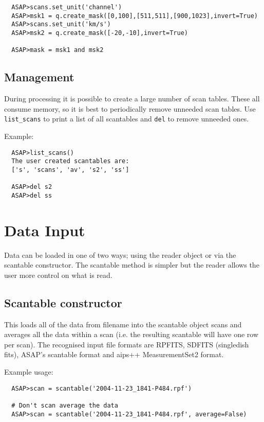 \documentclass[11pt]{article}
\newcommand{\cmd}[1]{{\tt #1}}
\begin{document}
\begin{verbatim}
  ASAP>scans.set_unit('channel')
  ASAP>msk1 = q.create_mask([0,100],[511,511],[900,1023],invert=True)
  ASAP>scans.set_unit('km/s')
  ASAP>msk2 = q.create_mask([-20,-10],invert=True)

  ASAP>mask = msk1 and msk2
\end{verbatim}


\subsection{Management}

During processing it is possible to create
a large number of scan tables. These all consume memory, so it is best
to periodically remove unneeded scan tables. Use \cmd{list\_scans} to
print a list of all scantables and \cmd{del} to remove unneeded ones.

Example:

\begin{verbatim}
  ASAP>list_scans()
  The user created scantables are:
  ['s', 'scans', 'av', 's2', 'ss']

  ASAP>del s2
  ASAP>del ss
\end{verbatim}

\section{Data Input}

Data can be loaded in one of two ways; using the
reader object or via the scantable constructor. The scantable method
is simpler but the reader allows the user more control on what is read.

\subsection{Scantable constructor}

This loads
all of the data from filename into the scantable object scans and
averages all the data within a scan (i.e.  the resulting scantable
will have one row per scan).  The recognised input file formats are
RPFITS, SDFITS (singledish fits), ASAP's scantable format and aips++
MeasurementSet2 format.

Example usage:

\begin{verbatim}
  ASAP>scan = scantable('2004-11-23_1841-P484.rpf')

  # Don't scan average the data
  ASAP>scan = scantable('2004-11-23_1841-P484.rpf', average=False)
\end{verbatim}
\end{document}
